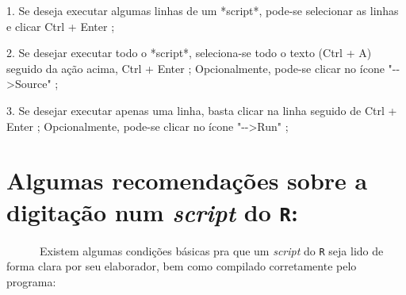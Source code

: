 \documentclass[
  letterpaper,
  DIV=11,
  numbers=noendperiod]{scrreprt}
\newenvironment{Shaded}{\begin{snugshade}}{\end{snugshade}}
\newcommand{\FloatTok}[1]{\textcolor[rgb]{0.68,0.00,0.00}{#1}}
\newcommand{\FunctionTok}[1]{\textcolor[rgb]{0.28,0.35,0.67}{#1}}
\newcommand{\NormalTok}[1]{\textcolor[rgb]{0.00,0.23,0.31}{#1}}
\newcommand{\SpecialCharTok}[1]{\textcolor[rgb]{0.37,0.37,0.37}{#1}}
\newcommand{\StringTok}[1]{\textcolor[rgb]{0.13,0.47,0.30}{#1}}
\begin{document}
\begin{Shaded}
\begin{Highlighting}[]
\FloatTok{1.}\NormalTok{ Se deseja executar algumas linhas de um }\SpecialCharTok{*}\NormalTok{script}\SpecialCharTok{*}\NormalTok{, pode}\SpecialCharTok{{-}}\NormalTok{se selecionar as linhas e clicar Ctrl }\SpecialCharTok{+}\NormalTok{ Enter ;}

\FloatTok{2.}\NormalTok{ Se desejar executar todo o }\SpecialCharTok{*}\NormalTok{script}\SpecialCharTok{*}\NormalTok{, seleciona}\SpecialCharTok{{-}}\NormalTok{se todo o }\FunctionTok{texto}\NormalTok{ (Ctrl }\SpecialCharTok{+}\NormalTok{ A) seguido da ação acima, Ctrl }\SpecialCharTok{+}\NormalTok{ Enter ;}
\NormalTok{   Opcionalmente, pode}\SpecialCharTok{{-}}\NormalTok{se clicar no ícone }\StringTok{"{-}{-}\textgreater{}Source"}\NormalTok{ ;}
   
\FloatTok{3.}\NormalTok{ Se desejar executar apenas uma linha, basta clicar na linha seguido de Ctrl }\SpecialCharTok{+}\NormalTok{ Enter ;}
\NormalTok{   Opcionalmente, pode}\SpecialCharTok{{-}}\NormalTok{se clicar no ícone }\StringTok{"{-}{-}\textgreater{}Run"}\NormalTok{ ;}
\end{Highlighting}
\end{Shaded}

\section{\texorpdfstring{Algumas recomendações sobre a digitação num
\emph{script} do
\texttt{R}:}{Algumas recomendações sobre a digitação num script do R:}}\label{algumas-recomendauxe7uxf5es-sobre-a-digitauxe7uxe3o-num-script-do-r}

~~~~~~Existem algumas condições básicas pra que um \emph{script} do
\texttt{R} seja lido de forma clara por seu elaborador, bem como
compilado corretamente pelo programa:
\end{document}
